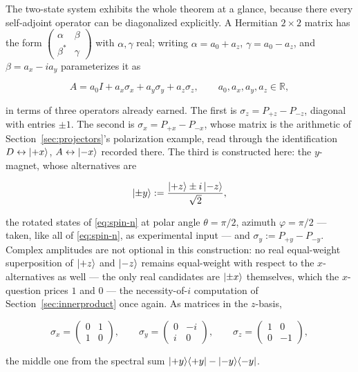 The two-state system exhibits the whole theorem at a glance, because there every self-adjoint operator can be diagonalized explicitly. A Hermitian $2\times2$ matrix has the form $\begin{pmatrix}\alpha&\beta\\\beta^{*}&\gamma\end{pmatrix}$ with $\alpha,\gamma$ real; writing $\alpha=a_0+a_z$, $\gamma=a_0-a_z$, and $\beta=a_x-ia_y$ parameterizes it as
\begin{linenomath}
\begin{equation}
    A=a_0 I+a_x\sigma_x+a_y\sigma_y+a_z\sigma_z,
    \qquad
    a_0,a_x,a_y,a_z\in\mathbb{R},
    \label{eq:hermitian-2d}
\end{equation}
\end{linenomath}
in terms of three operators already earned. The first is $\sigma_z=P_{+z}-P_{-z}$, diagonal with entries $\pm1$. The second is $\sigma_x=P_{+x}-P_{-x}$, whose matrix is the arithmetic of Section~\ref{sec:projectors}'s polarization example, read through the identification $D\leftrightarrow\ket{+x}$, $A\leftrightarrow\ket{-x}$ recorded there. The third is constructed here: the $y$-magnet, whose alternatives are
\begin{linenomath}
\begin{equation}
    \ket{\pm y}:=\frac{\ket{+z}\pm i\ket{-z}}{\sqrt2},
\end{equation}
\end{linenomath}
the rotated states of \eqref{eq:spin-n} at polar angle $\theta=\pi/2$, azimuth $\varphi=\pi/2$ --- taken, like all of \eqref{eq:spin-n}, as experimental input --- and $\sigma_y:=P_{+y}-P_{-y}$. Complex amplitudes are not optional in this construction: no real equal-weight superposition of $\ket{+z}$ and $\ket{-z}$ remains equal-weight with respect to the $x$-alternatives as well --- the only real candidates are $\ket{\pm x}$ themselves, which the $x$-question prices $1$ and $0$ --- the necessity-of-$i$ computation of Section~\ref{sec:innerproduct} once again. As matrices in the $z$-basis,
\begin{linenomath}
\begin{equation}
    \sigma_x=
    \begin{pmatrix}
        0&1\\
        1&0
    \end{pmatrix},
    \qquad
    \sigma_y=
    \begin{pmatrix}
        0&-i\\
        i&0
    \end{pmatrix},
    \qquad
    \sigma_z=
    \begin{pmatrix}
        1&0\\
        0&-1
    \end{pmatrix},
\end{equation}
\end{linenomath}
the middle one from the spectral sum $\ket{+y}\!\bra{+y}-\ket{-y}\!\bra{-y}$.


